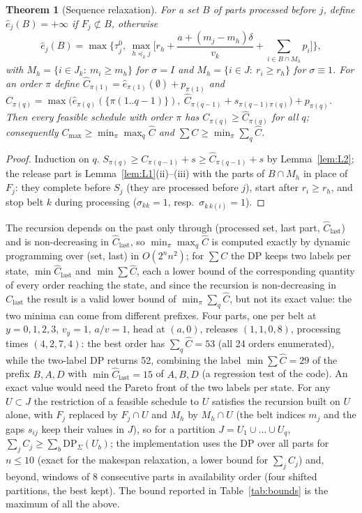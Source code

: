 \documentclass[11pt,a4paper]{article}
\theoremstyle{plain}
\newtheorem{theorem}{Theorem}
\theoremstyle{definition}
\theoremstyle{remark}
\begin{document}
\begin{theorem}[Sequence relaxation]\label{thm:L6}
For a set $B$ of parts processed before $j$, define $\hat e_j(B)=+\infty$ if
$F_j\not\subset B$, otherwise
\[
\hat e_j(B)=\max\Big\{\tau^0_j,\ \max_{h\preceq_kj}\Big[r_h+\frac{a+(m_j-m_h)\delta}{v_k}+\sum_{i\in B\cap M_h}p_i\Big]\Big\},
\]
with $M_h=\{i\in J_k:\ m_i\ge m_h\}$ for $\sigma=I$ and $M_h=\{i\in J:\ r_i\ge r_h\}$ for
$\sigma\equiv1$. For an order $\pi$ define $\hat C_{\pi(1)}=\hat e_{\pi(1)}(\emptyset)+p_{\pi(1)}$
and $\hat C_{\pi(q)}=\max\bigl(\hat e_{\pi(q)}(\{\pi(1..q{-}1)\}),\ \hat C_{\pi(q-1)}+s_{\pi(q-1)\pi(q)}\bigr)+p_{\pi(q)}$.
Then every feasible schedule with order $\pi$ has $C_{\pi(q)}\ge\hat C_{\pi(q)}$ for all
$q$; consequently $C_{\max}\ge\min_\pi\max_q\hat C$ and $\sum C\ge\min_\pi\sum_q\hat C$.
\end{theorem}
\begin{proof}
Induction on $q$. $S_{\pi(q)}\ge C_{\pi(q-1)}+s\ge\hat C_{\pi(q-1)}+s$ by Lemma~\ref{lem:L2};
the release part is Lemma~\ref{lem:L1}(ii)--(iii) with the parts of $B\cap M_h$ in place of
$F_j$: they complete before $S_j$ (they are processed before $j$), start after
$r_i\ge r_h$, and stop belt $k$ during processing ($\sigma_{kk}=1$, resp.\
$\sigma_{k\,k(i)}=1$).
\end{proof}
The recursion depends on the past only through (processed set, last part,
$\hat C_{\text{last}}$) and is non-decreasing in $\hat C_{\text{last}}$, so
$\min_\pi\max_q\hat C$ is computed exactly by dynamic programming over (set, last) in
$O(2^nn^2)$; for $\sum C$ the DP keeps two labels per state, $\min\hat C_{\text{last}}$ and
$\min\sum\hat C$, each a lower bound of the corresponding quantity of every order reaching
the state, and since the recursion is non-decreasing in $\hat C_{\text{last}}$ the result
is a valid lower bound of $\min_\pi\sum_q\hat C$, but not its exact value: the two minima can
come from different prefixes. Four parts, one per belt at $y=0,1,2,3$, $v_y=1$, $a/v=1$,
head at $(a,0)$, releases $(1,1,0,8)$, processing times $(4,2,7,4)$: the best order has
$\sum_q\hat C=53$ (all 24 orders enumerated), while the two-label DP returns 52, combining
the label $\min\sum\hat C=29$ of the prefix $B,A,D$ with $\min\hat C_{\text{last}}=15$ of
$A,B,D$ (a regression test of the code). An exact value would need the Pareto front of the
two labels per state. For any $U\subset J$ the restriction of a feasible schedule to $U$
satisfies the recursion built on $U$ alone, with $F_j$ replaced by $F_j\cap U$ and $M_h$ by
$M_h\cap U$ (the belt indices $m_j$ and the gaps $s_{ij}$ keep their values in $J$), so
for a partition $J=U_1\cup\dots\cup U_q$, $\sum_jC_j\ge\sum_b\mathrm{DP}_\Sigma(U_b)$; the
implementation uses the DP over all parts for $n\le10$ (exact for the makespan relaxation,
a lower bound for $\sum_jC_j$) and, beyond, windows of 8 consecutive parts
in availability order (four shifted partitions, the best kept). The bound reported in
Table~\ref{tab:bounds} is the maximum of all the above.
\end{document}
